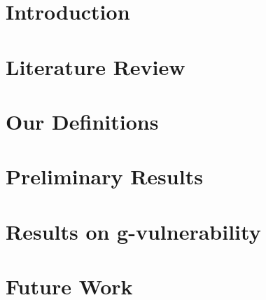 \documentclass{article}
\begin{document}
\section{Introduction}



\section{Literature Review}





\section{Our Definitions}




\section{Preliminary Results}





\section{Results on g-vulnerability}





\section{Future Work}




{}
\end{document}
